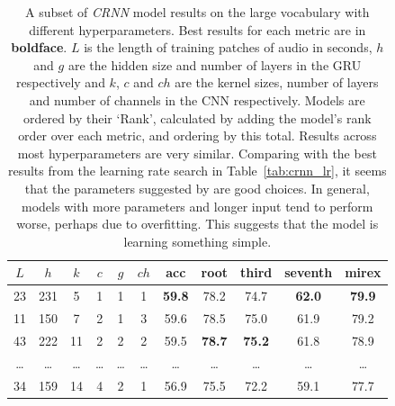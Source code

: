 \begin{table}[h]
    \centering
    \begin{tabular}{ccccccccccc}
        \toprule
        $L$ & $h$ & $k$ & $c$ & $g$ & $ch$ & acc & root & third & seventh & mirex \\
        \midrule
        23 & 231 & 5 & 1 & 1 & 1 & \textbf{59.8} & 78.2 & 74.7 & \textbf{62.0} & \textbf{79.9} \\
        11 & 150 & 7 & 2 & 1 & 3 & 59.6 & 78.5 & 75.0 & 61.9 & 79.2 \\
        43 & 222 & 11 & 2 & 2 & 2 & 59.5 & \textbf{78.7} & \textbf{75.2} & 61.8 & 78.9 \\
        \ldots & \ldots & \ldots & \ldots & \ldots & \ldots & \ldots & \ldots & \ldots & \ldots & \ldots \\
        34 & 159 & 14 & 4 & 2 & 1 & 56.9 & 75.5 & 72.2 & 59.1 & 77.7 \\
        \bottomrule
    \end{tabular}
    \caption{A subset of \emph{CRNN} model results on the large vocabulary with different hyperparameters. Best results for each metric are in \textbf{boldface}. $L$ is the length of training patches of audio in seconds, $h$ and $g$ are the hidden size and number of layers in the GRU respectively and $k$, $c$ and $ch$ are the kernel sizes, number of layers and number of channels in the CNN respectively. Models are ordered by their `Rank', calculated by adding the model's rank order over each metric, and ordering by this total. Results across most hyperparameters are very similar. Comparing with the best results from the learning rate search in Table~\ref{tab:crnn_lr}, it seems that the parameters suggested by \citet{StructuredTraining} are good choices. In general, models with more parameters and longer input tend to perform worse, perhaps due to overfitting. This suggests that the model is learning something simple.}\label{tab:crnn_hparams}
\end{table}



